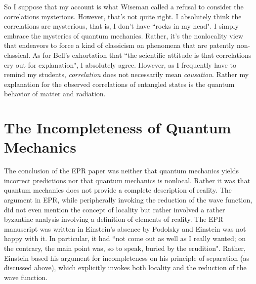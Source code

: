 \documentclass[12pt]{article}
\begin{document}
So I suppose that my account is what Wiseman called a refusal to consider the correlations mysterious.  However, that's not quite right.  I absolutely think the correlations are mysterious, that is, I don't have ``rocks in my head".  I simply embrace the mysteries of quantum mechanics.  Rather, it's the nonlocality view that endeavors to force a kind of classicism on phenomena that are patently non-classical.  As for Bell's exhortation that ``the scientific attitude is that correlations cry out for explanation", I absolutely agree.  However, as I frequently have to remind my students, {\it correlation} does not necessarily mean {\it causation}.  Rather my explanation for the observed correlations of entangled states is the quantum behavior of matter and radiation.

\section{The Incompleteness of Quantum Mechanics} \label{IQM}

The conclusion of the EPR paper was neither that quantum mechanics yields incorrect predictions nor that quantum mechanics is nonlocal.  Rather it was that quantum mechanics does not provide a complete description of reality. The argument in EPR, while peripherally invoking the reduction of the wave function, did not even mention the concept of locality but rather involved a rather byzantine analysis involving a definition of elements of reality. The EPR manuscript was written in Einstein's absence by Podolsky and Einstein was not happy with it.  In particular, it had ``not come out as well as I really wanted; on the contrary, the main point was, so to speak, buried by the erudition"\cite{How07}.  Rather, Einstein based his argument for incompleteness on his principle of separation (as discussed above), which explicitly invokes both locality and the reduction of the wave function.
\end{document}

